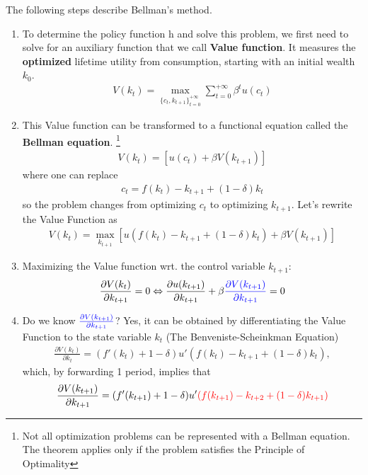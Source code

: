 \documentclass[11pt,a4paper]{book}
\newcommand{\red}[1]{\textcolor{red}{#1}}
\newcommand{\blue}[1]{\textcolor{blue}{#1}}
\theoremstyle{definition}\newtheorem{definition}{Definition}
\theoremstyle{definition}\newtheorem{fact}{Fact}
\theoremstyle{definition}\newtheorem{remark}{Remark}
\theoremstyle{definition}\newtheorem{ex}{Ex.}
\theoremstyle{definition}\newtheorem{project}{Project}
\theoremstyle{definition}\newtheorem{problem}{Problem}
\theoremstyle{definition}\newtheorem{example}{Example}
\numberwithin{theorem}{section}
\numberwithin{corollary}{chapter}
\numberwithin{assumption}{chapter}
\numberwithin{definition}{chapter}
\numberwithin{prop}{chapter}
\numberwithin{notation}{chapter}
\numberwithin{problem}{chapter}
\numberwithin{example}{chapter}
\numberwithin{fact}{chapter}
\numberwithin{ex}{chapter}
\begin{document}
	The following steps describe Bellman's method.
	\begin{enumerate}
		\item To determine the policy function h and solve this problem, we first need to solve for
		an auxiliary function that we call \textbf{Value function}. It measures the \textbf{optimized} lifetime utility from consumption, starting with an initial wealth $k_0$.
		\begin{align*}
			V(k_t) = \max_{ \{c_t, k_{t+1}\}^{+\infty}_{t=0}  } \sum^{+\infty}_{t=0} \beta^t u(c_t)
		\end{align*}
		\item This Value function can be transformed to a functional equation called the \textbf{Bellman equation}. \footnote{Not all optimization problems can be represented with a Bellman equation. The
			theorem applies only if the problem satisfies the Principle of Optimality}
		\begin{align*}
			V(k_t) =  \left[ u(c_t) + \beta V(k_{t+1}) \right]
		\end{align*}
		where one can replace
		\begin{align*}
			c_t = f(k_t) - k_{t+1} + (1-\delta) k_t
		\end{align*}
		so the problem changes from optimizing $c_t$ to optimizing $k_{t+1}$. Let's rewrite the Value Function as
		\begin{align*}
			V(k_t) = \max_{k_{t+1}} \left[ u(f(k_t) - k_{t+1} + (1-\delta)k_t) +\beta V(k_{t+1}) \right] 
		\end{align*}
		\item Maximizing the Value function wrt. the control variable $k_{t+1}$:
		\begin{align*}
			\frac{\partial V(k_t)}{\partial k_{t+1}} = 0 \Leftrightarrow \frac{\partial u(k_{t+1})}{\partial k_{t+1}} + \beta \blue{\frac{\partial V(k_{t+1})}{\partial k_{t+1}}} = 0 
		\end{align*}
		\item Do we know $\blue{\frac{\partial V(k_{t+1})}{\partial k_{t+1}}}$? Yes, it can be obtained by differentiating the Value Function to the state variable $k_t$ (The Benveniste-Scheinkman Equation)
		\begin{align*}
			\frac{\partial V(k_t)}{\partial k_t} = (f'(k_t) + 1-\delta) u'( f(k_t) - k_{t+1} + (1-\delta)k_t ), 
		\end{align*}
		which, by forwarding 1 period, implies that
		\begin{align*}
			\frac{\partial V(k_{t+1})}{\partial k_{t+1}} &= (f'(k_{t+1}) + 1-\delta) u'\red{( f(k_{t+1}) - k_{t+2} + (1-\delta)k_{t+1} )} \\

\end{align*}
\end{enumerate}
\end{document}
